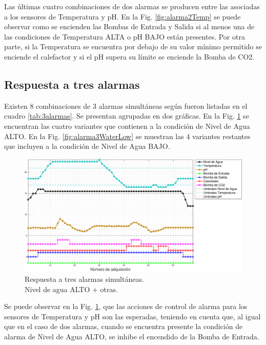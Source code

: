 Las últimas cuatro combinaciones de dos alarmas se producen entre las asociadas a los sensores de Temperatura y pH.  En la Fig. \ref{fig:alarma2Temp} se puede observar como se encienden las Bombas de Entrada y Salida si al menos una de las condiciones de Temperatura ALTA o pH BAJO están presentes.  Por otra parte, si la Temperatura se encuentra por debajo de su valor mínimo permitido se enciende el calefactor y si el pH supera su límite se enciende la Bomba de CO2.


\subsection{Respuesta a tres alarmas}
\label{sec:3alarma}

Existen 8 combinaciones de 3 alarmas simultáneas según fueron listadas en el cuadro \ref{tab:3alarmas}. Se presentan agrupadas en dos gráficas.  En la Fig. \ref{fig:alarma3WaterHigh} se encuentran las cuatro variantes que contienen a la condición de Nivel de Agua ALTO. En la Fig. \ref{fig:alarma3WaterLow} se muestran las 4 variantes restantes que incluyen a la condición de Nivel de Agua BAJO. 

\begin{figure}[h]
\centering
    \includegraphics[width=\textwidth]{./Figures/plot3waterHigh.pdf}
	\caption{Respuesta a tres alarmas simultáneas.\\ Nivel de agua ALTO + otras.}
	\label{fig:alarma3WaterHigh}
\end{figure}

Se puede observar en la Fig. \ref{fig:alarma3WaterHigh}, que las acciones de control de alarma  para los sensores de Temperatura y pH son las esperadas, teniendo en cuenta que, al igual que en el caso de dos alarmas, cuando se encuentra presente la condición de alarma de Nivel de Agua ALTO, se inhibe el encendido de la Bomba de Entrada.

